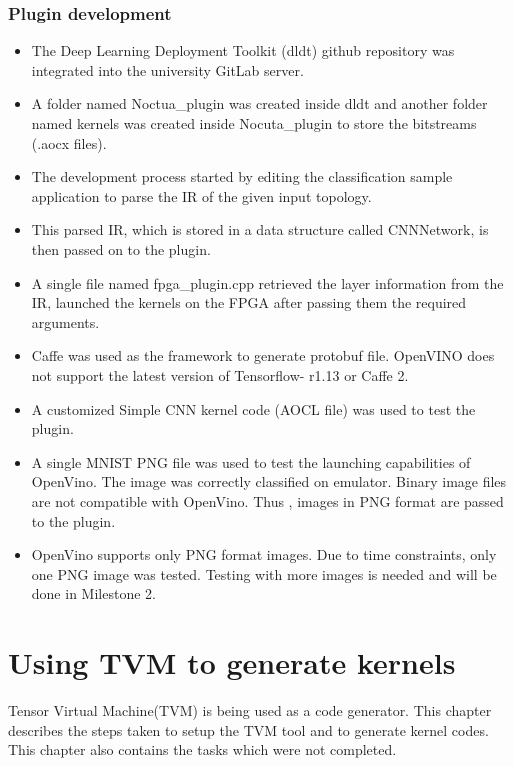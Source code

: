 \documentclass[titlepage]{report}
\begin{document}
\subsection{Plugin development}
\begin{itemize}
\item The Deep Learning Deployment Toolkit (dldt) github repository was integrated into the university GitLab server. 
\item A folder named Noctua\_plugin was created inside dldt and another folder named kernels was created inside Nocuta\_plugin to store the bitstreams (.aocx files).
\item The development process started by editing the classification sample application to parse the IR of the given input topology. 
\item This parsed IR, which is stored in a data structure called CNNNetwork, is then passed on to the plugin. 
\item A single file named fpga\_plugin.cpp retrieved the layer information from the IR, launched the kernels on the FPGA after passing them the required arguments.
\item Caffe was used as the framework to generate protobuf file. OpenVINO does not support the latest version of Tensorflow- r1.13 or Caffe 2.
\item A customized Simple CNN kernel code (AOCL file) was used to test the plugin.
\item A single MNIST PNG file was used to test the launching capabilities of OpenVino. The image was correctly classified on emulator. Binary image files are not compatible with OpenVino. Thus , images in PNG format are passed to the plugin.
\item OpenVino supports only PNG format images. Due to time constraints, only one PNG image was tested. Testing with more images is needed and will be done in Milestone 2.
 
\end{itemize} 





\chapter{Using TVM to generate kernels}
Tensor Virtual Machine(TVM) is being used as a code generator. This chapter describes the steps taken to setup the TVM tool and to generate kernel codes. This chapter also contains the tasks which were not completed.
\end{document}
